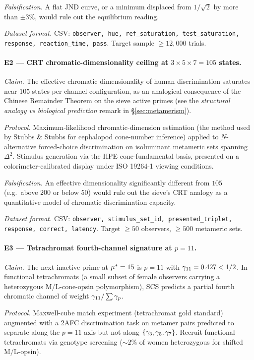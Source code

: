 \documentclass[12pt,a4paper]{article}
\begin{document}
\emph{Falsification.} A flat JND curve, or a minimum displaced from
$1/\sqrt{2}$ by more than $\pm 3\%$, would rule out the equilibrium
reading.

\emph{Dataset format.} CSV: \texttt{observer, hue, ref\_saturation,
test\_saturation, response, reaction\_time, pass}. Target
sample $\geq 12{,}000$ trials.

\paragraph{E2 --- CRT chromatic-dimensionality ceiling at
$3 \times 5 \times 7 = 105$ states.}
\emph{Claim.} The effective chromatic dimensionality of human
discrimination saturates near $105$ states per channel configuration,
as an analogical consequence of the Chinese Remainder Theorem
on the sieve active primes (see the \emph{structural analogy vs
biological prediction} remark in \S\ref{sec:metamerism}).

\emph{Protocol.} Maximum-likelihood chromatic-dimension estimation
(the method used by Stubbs \& Stubbs for cephalopod cone-number
inference) applied to $N$-alternative forced-choice discrimination
on isoluminant metameric sets spanning $\Delta^2$. Stimulus generation
via the HPE cone-fundamental basis, presented on a colorimeter-calibrated
display under ISO 19264-1 viewing conditions.

\emph{Falsification.} An effective dimensionality significantly
different from $105$ (e.g.\ above $200$ or below $50$) would rule out
the sieve's CRT analogy as a quantitative model of chromatic
discrimination capacity.

\emph{Dataset format.} CSV: \texttt{observer, stimulus\_set\_id,
presented\_triplet, response, correct, latency}. Target $\geq 50$
observers, $\geq 500$ metameric sets.

\paragraph{E3 --- Tetrachromat fourth-channel signature at $p = 11$.}
\emph{Claim.} The next inactive prime at ${\mu^{*}} = 15$ is $p = 11$
with $\gamma_{11} = 0.427 < 1/2$. In functional tetrachromats (a small
subset of female observers carrying a heterozygous
M/L-cone-opsin polymorphism), SCS predicts a partial fourth chromatic
channel of weight $\gamma_{11}/\sum \gamma_{p}$.

\emph{Protocol.} Maxwell-cube match experiment (tetrachromat gold
standard) augmented with a 2AFC discrimination task on metamer pairs
predicted to separate along the $p = 11$ axis but not along
$\{\gamma_{3}, \gamma_{5}, \gamma_{7}\}$. Recruit functional tetrachromats
via genotype screening ($\sim 2\%$ of women heterozygous for shifted
M/L-opsin).
\end{document}

